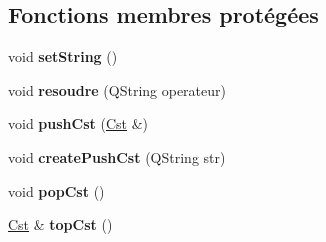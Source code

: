 \subsection*{Fonctions membres protégées}
\begin{DoxyCompactItemize}
\item 
\hypertarget{classcalcul_1_1_pile_cst_a18669dd1a2a2128825ba9d04faf00140}{void {\bfseries set\-String} ()}\label{classcalcul_1_1_pile_cst_a18669dd1a2a2128825ba9d04faf00140}

\item 
\hypertarget{classcalcul_1_1_pile_cst_a5897e5eff8a6f4a5ad579b7a9d561564}{void {\bfseries resoudre} (Q\-String operateur)}\label{classcalcul_1_1_pile_cst_a5897e5eff8a6f4a5ad579b7a9d561564}

\item 
\hypertarget{classcalcul_1_1_pile_cst_aa749a89f28cde842103b5834ecab0380}{void {\bfseries push\-Cst} (\hyperlink{classcalcul_1_1_cst}{Cst} \&)}\label{classcalcul_1_1_pile_cst_aa749a89f28cde842103b5834ecab0380}

\item 
\hypertarget{classcalcul_1_1_pile_cst_a73d8133d9c8da0f330f5c21e14202cf2}{void {\bfseries create\-Push\-Cst} (Q\-String str)}\label{classcalcul_1_1_pile_cst_a73d8133d9c8da0f330f5c21e14202cf2}

\item 
\hypertarget{classcalcul_1_1_pile_cst_a93809d1514ea7904d3bf3cef470714e4}{void {\bfseries pop\-Cst} ()}\label{classcalcul_1_1_pile_cst_a93809d1514ea7904d3bf3cef470714e4}

\item 
\hypertarget{classcalcul_1_1_pile_cst_a1f2d20a83827d3c16753669175451008}{\hyperlink{classcalcul_1_1_cst}{Cst} \& {\bfseries top\-Cst} ()}\label{classcalcul_1_1_pile_cst_a1f2d20a83827d3c16753669175451008}

\end{DoxyCompactItemize}
